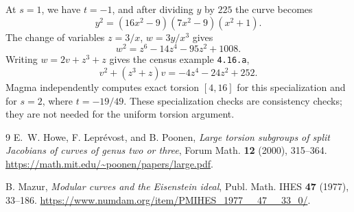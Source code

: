 \documentclass[11pt]{article}
\begin{document}
At \(s=1\), we have \(t=-1\), and after dividing \(y\) by \(225\)
the curve becomes
\[
 y^2=(16x^2-9)(7x^2-9)(x^2+1).
\]
The change of variables \(z=3/x\), \(w=3y/x^3\) gives
\[
 w^2=z^6-14z^4-95z^2+1008.
\]
Writing \(w=2v+z^3+z\) gives the census example \texttt{4.16.a},
\[
 v^2+(z^3+z)v=-4z^4-24z^2+252.
\]
Magma independently computes exact torsion \([4,16]\) for this
specialization and for \(s=2\), where \(t=-19/49\).
These specialization checks are consistency checks; they are not
needed for the uniform torsion argument.

\begin{thebibliography}{9}
E.~W. Howe, F. Lepr\'evost, and B. Poonen,
\emph{Large torsion subgroups of split Jacobians of curves of genus two or three},
Forum Math. \textbf{12} (2000), 315--364.
\url{https://math.mit.edu/~poonen/papers/large.pdf}.

B. Mazur,
\emph{Modular curves and the Eisenstein ideal},
Publ. Math. IHES \textbf{47} (1977), 33--186.
\url{https://www.numdam.org/item/PMIHES_1977__47__33_0/}.
\end{thebibliography}
\end{document}
